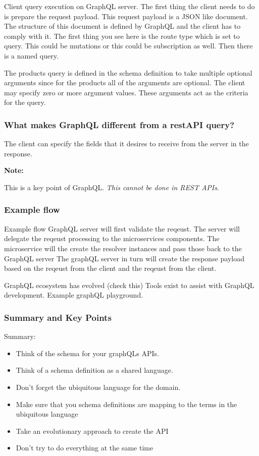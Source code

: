 \documentclass[a4paper, 11pt]{book}
\newenvironment{note}{
    \begin{siderule}
        \textbf{Note: }
        }{
    \end{siderule}
}
\begin{document}
    Client query execution on GraphQL server.
    The first thing the client needs to do is prepare the request payload.
    This request payload is a JSON like document.
    The structure of this document is defined by GraphQL and the client has to comply with it.
    The first thing you see here is the route type which is set to query.
    This could be mutations or this could be subscription as well.
    Then there is a named query.

    The products query is defined in the schema definition to take multiple optional arguments since for the products all of the arguments are optional.
    The client may specify zero or more argument values.
    These arguments act as the criteria for the query.

    \subsubsection{What makes GraphQL different from a restAPI query?}
    The client can specify the fields that it desires to receive from the server in the response.

    \begin{note}
        This is a key point of GraphQL. \textit{This cannot be done in REST APIs}.
    \end{note}

    \subsubsection{Example flow}
    Example flow
    GraphQL server will first validate the reqeust.
    The server will delegate the reqeust processing to the microservices components.
    The microservice will the create the resolver instances and pass those back to the GraphQL server
    The graphQL server in turn will create the response payload based on the reqeust from the client and the reqeust from the client.

    GraphQL ecosystem has evolved (check this)
    Tools exist to assist with GraphQL development.
    Example graphQL playground.

    \subsubsection{Summary and Key Points}
    Summary:

    \begin{itemize}
        \item Think of the schema for your graphQLs APIs.
        \item Think of a schema definition as a shared language.
        \item Don't forget the ubiquitous language for the domain.
        \item Make sure that you schema definitions are mapping to the terms in the ubiquitous language
        \item Take an evolutionary approach to create the API
        \item Don't try to do everything at the same time
    \end{itemize}
\end{document}

